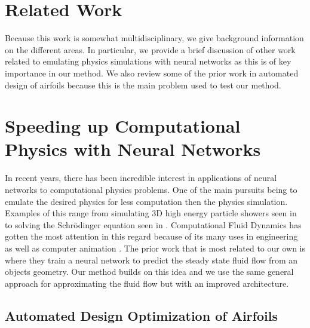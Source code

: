 \documentclass{article} %
\begin{document}
\section{Related Work}

Because this work is somewhat multidisciplinary, we give background information on the different areas. In particular, we provide a brief discussion of other work related to emulating physics simulations with neural networks as this is of key importance in our method. We also review some of the prior work in automated design of airfoils because this is the main problem used to test our method.

\section{Speeding up Computational Physics with Neural Networks}

In recent years, there has been incredible interest in applications of neural networks to computational physics problems. One of the main pursuits being to emulate the desired physics for less computation then the physics simulation. Examples of this range from simulating 3D high energy particle showers seen in \citet{2017arXiv170502355P} to solving the Schrödinger equation seen in \citet{mills2017deep}. Computational Fluid Dynamics has gotten the most attention in this regard because of its many uses in engineering as well as computer animation \citep{tompson2016accelerating} \citep{2017arXiv170509036H}. The prior work that is most related to our own is \citet{guo2016convolutional} where they train a neural network to predict the steady state fluid flow from an objects geometry. Our method builds on this idea and we use the same general approach for approximating the fluid flow but with an improved architecture.

\subsection{Automated Design Optimization of Airfoils}
\end{document}
